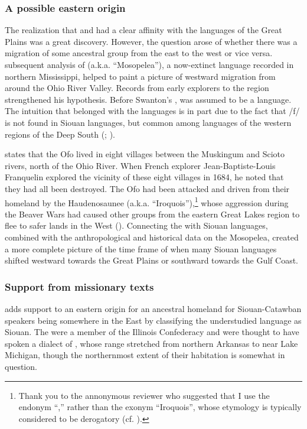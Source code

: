 \documentclass[output=paper]{LSP/langsci}
\begin{document}
\subsubsection{A possible eastern origin} The realization that  and  had a clear affinity with the  languages of the Great Plains was a great discovery. However, the question arose of whether there was a migration of some ancestral group from the east to the west or vice versa.  subsequent analysis of  (a.k.a. ``Mosopelea''), a now-extinct language recorded in northern Mississippi, helped to paint a picture of westward migration from around the Ohio River Valley. Records from early explorers to the region strengthened his hypothesis. Before Swanton's ,  was assumed to be a  language. The intuition that  belonged with the  languages is in part due to the fact that /f/ is not found in Siouan languages, but common among languages of the western regions of the Deep South (\citealt{Rankin2004ofo}; \citealt{Kaufman2014}). 

\citet{Hanna1911} states that the Ofo lived in eight villages between the Muskingum and Scioto rivers, north of the Ohio River. When French explorer Jean-Baptiste-Louis Franquelin explored the vicinity of these eight villages in 1684, he noted that they had all been destroyed. The Ofo had been attacked and driven from their homeland by the Haudenosaunee (a.k.a. ``Iroquois''),\footnote{Thank you to the annonymous reviewer who suggested that I use the endonym ``,'' rather than the exonym ``Iroquois'', whose etymology is typically considered to be derogatory (cf. \citealt{Day1968}).} whose aggression during the Beaver Wars had caused other groups from the eastern Great Lakes region to flee to safer lands in the West (\citealt{Swanton1952}). Connecting the  with Siouan languages, combined with the anthropological and historical data on the Mosopelea, created a more complete picture of the time frame of when many Siouan languages shifted westward towards the Great Plains or southward towards the Gulf Coast. 

\subsubsection{Support from missionary texts} \citet{Koontz1995a,Koontz1995b} adds support to an eastern origin for an ancestral homeland for Siouan-Catawban speakers being somewhere in the East by classifying the understudied  language  as Siouan. The  were a member of the Illinois Confederacy and were thought to have spoken a dialect of , whose range stretched from northern Arkansas to near Lake Michigan, though the northernmost extent of their habitation is somewhat in question. 
\end{document}
